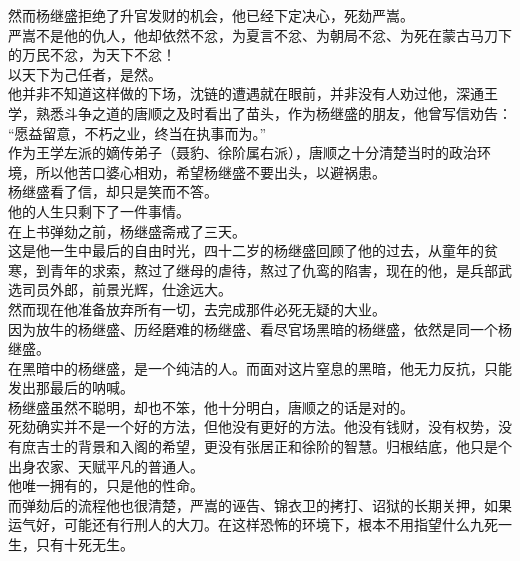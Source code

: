 \begin{multicols}{\theparacolNo}
然而杨继盛拒绝了升官发财的机会，他已经下定决心，死劾严嵩。\\

严嵩不是他的仇人，他却依然不忿，为夏言不忿、为朝局不忿、为死在蒙古马刀下的万民不忿，为天下不忿！\\

以天下为己任者，是然。\\

他并非不知道这样做的下场，沈链的遭遇就在眼前，并非没有人劝过他，深通王学，熟悉斗争之道的唐顺之及时看出了苗头，作为杨继盛的朋友，他曾写信劝告：\\

“愿益留意，不朽之业，终当在执事而为。”\\

作为王学左派的嫡传弟子（聂豹、徐阶属右派），唐顺之十分清楚当时的政治环境，所以他苦口婆心相劝，希望杨继盛不要出头，以避祸患。\\

杨继盛看了信，却只是笑而不答。\\

他的人生只剩下了一件事情。\\

在上书弹劾之前，杨继盛斋戒了三天。\\

这是他一生中最后的自由时光，四十二岁的杨继盛回顾了他的过去，从童年的贫寒，到青年的求索，熬过了继母的虐待，熬过了仇鸾的陷害，现在的他，是兵部武选司员外郎，前景光辉，仕途远大。\\

然而现在他准备放弃所有一切，去完成那件必死无疑的大业。\\

因为放牛的杨继盛、历经磨难的杨继盛、看尽官场黑暗的杨继盛，依然是同一个杨继盛。\\

在黑暗中的杨继盛，是一个纯洁的人。而面对这片窒息的黑暗，他无力反抗，只能发出那最后的呐喊。\\

杨继盛虽然不聪明，却也不笨，他十分明白，唐顺之的话是对的。\\

死劾确实并不是一个好的方法，但他没有更好的方法。他没有钱财，没有权势，没有庶吉士的背景和入阁的希望，更没有张居正和徐阶的智慧。归根结底，他只是个出身农家、天赋平凡的普通人。\\

他唯一拥有的，只是他的性命。\\

而弹劾后的流程他也很清楚，严嵩的诬告、锦衣卫的拷打、诏狱的长期关押，如果运气好，可能还有行刑人的大刀。在这样恐怖的环境下，根本不用指望什么九死一生，只有十死无生。\\


\end{multicols}
